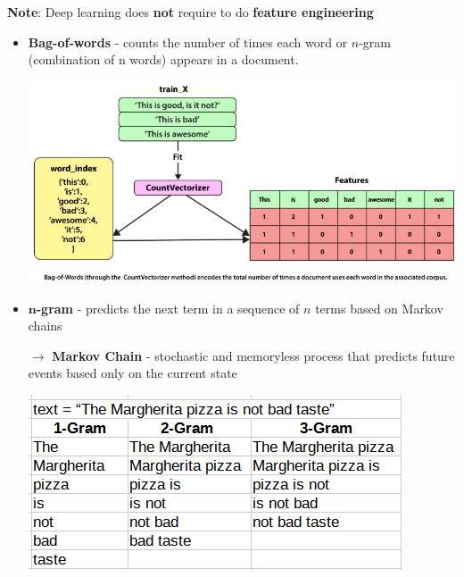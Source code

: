 \documentclass[letterpaper, 10.5pt,landscape]{article}
\begin{document}
\begin{multicols*}{3}
\vspace{3pt}
\textbf{Note}: Deep learning does \textbf{not} require to do \textbf{feature engineering} 

\begin{itemize}[label={--},leftmargin=4mm]

\item \textbf{Bag-of-words} - counts the number of times each word or $n$-gram (combination of n words) appears in a document.
\vspace{-3pt}


\vspace{-5pt}
\begin{center}
    \begin{minipage}{\linewidth}
    \includegraphics[width=\textwidth]{figures/tokenizers_bag_of_words.png}
    \end{minipage}
\end{center}
\vspace{-5pt}

\item $\boldsymbol{n}$\textbf{-gram} - predicts the next term in a sequence of $n$ terms based on Markov chains
\vspace{-3pt}


$\rightarrow$ \textbf{Markov Chain} - stochastic and memoryless process that predicts future events based only on the current state
\vspace{-3pt}


\vspace{-5pt}
\begin{center}
    \begin{minipage}{0.6\linewidth}
    \includegraphics[width=\textwidth]{figures/nlp_n_grams.png}
    \end{minipage}
\end{center}
\vspace{-5pt}



\end{itemize}
\end{multicols*}
\end{document}
